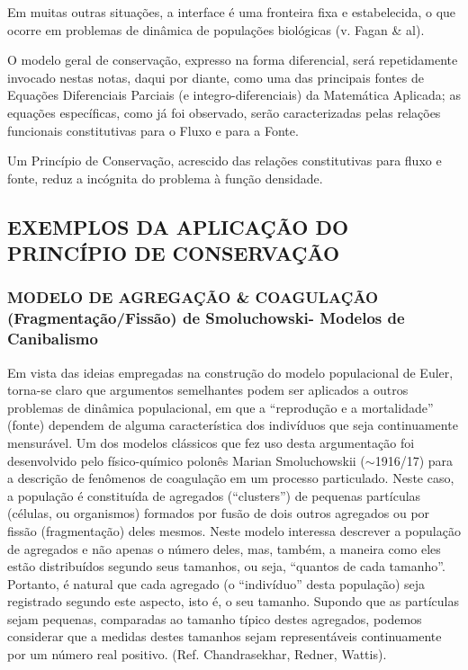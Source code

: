 {Em muitas outras situações, a interface é uma fronteira fixa e estabelecida, o que ocorre em problemas de dinâmica de populações biológicas (v. Fagan \& al).

O modelo geral de conservação, expresso na forma diferencial, será repetidamente invocado nestas notas, daqui por diante, como uma das principais fontes de Equações Diferenciais Parciais (e integro-diferenciais) da Matemática Aplicada; as equações específicas, como já foi observado, serão caracterizadas pelas relações funcionais constitutivas para o Fluxo e para a Fonte.

Um Princípio de Conservação, acrescido das relações constitutivas para fluxo e fonte, reduz a incógnita do problema à função densidade.
}


\subsection{EXEMPLOS DA APLICAÇÃO DO PRINCÍPIO DE CONSERVAÇÃO}

\subsubsection{MODELO DE AGREGAÇÃO \& COAGULAÇÃO (Fragmentação/Fissão) de Smoluchowski- Modelos de Canibalismo}

Em vista das ideias empregadas na construção do modelo populacional de Euler, torna-se claro que argumentos semelhantes podem ser aplicados a outros problemas de dinâmica populacional, em que a ``reprodução e a mortalidade'' (fonte) dependem de alguma característica dos indivíduos que seja continuamente mensurável. Um dos modelos clássicos que fez uso desta argumentação foi desenvolvido pelo físico-químico polonês Marian Smoluchowskii (\(\sim\)1916/17) para a descrição de fenômenos de coagulação em um processo particulado. Neste caso, a população é constituída de agregados (``clusters'') de pequenas partículas (células, ou organismos) formados por fusão de dois outros agregados ou por fissão (fragmentação) deles mesmos. Neste modelo interessa descrever a população de agregados e não apenas o número deles, mas, também, a maneira como eles estão distribuídos segundo seus tamanhos, ou seja, ``quantos de cada tamanho''. Portanto, é natural que cada agregado (o ``indivíduo'' desta população) seja registrado segundo este aspecto, isto é, o seu tamanho. Supondo que as partículas sejam pequenas, comparadas ao tamanho típico destes agregados, podemos considerar que a medidas destes tamanhos sejam representáveis continuamente por um número real positivo. (Ref. Chandrasekhar, Redner, Wattis).

